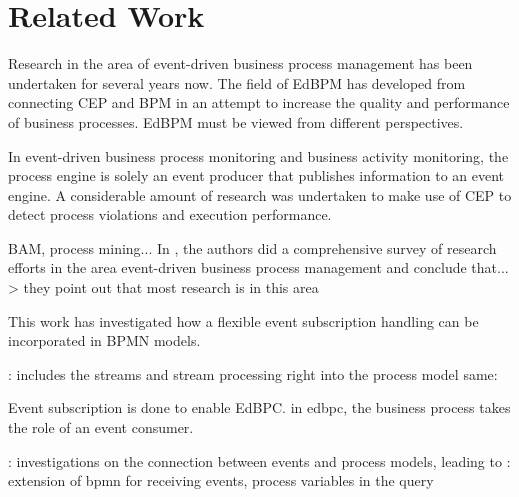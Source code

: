 \chapter{Related Work}\label{ch:relatedwork}
Research in the area of event-driven business process management has been undertaken for several years now.
The field of \acf{EdBPM} has developed from connecting \ac{CEP} and \ac{BPM} in an attempt to increase the quality and performance of business processes.
\acs{EdBPM} must be viewed from different perspectives.


In event-driven business process monitoring and business activity monitoring, the process engine is solely an event producer that publishes information to an event engine.
A considerable amount of research was undertaken to make use of CEP to detect process violations and execution performance. 

BAM, process mining... \cite{janiesch:poc-eventdriven-bam}
In \cite{Krumeich2014EventDrivenBP}, the authors did a comprehensive survey of research efforts in the area event-driven business process management and conclude that... > they point out that most research is in this area


This work has investigated how a flexible event subscription handling can be incorporated in BPMN models.

\cite{appel2014modeling}: includes the streams and stream processing right into the process model
same: \cite{biornstad2006control}

Event subscription is done to enable \ac{EdBPC}.
in edbpc, the business process takes the role of an event consumer.

\cite{Cabanillas2014}: investigations on the connection between events and process models, leading to \cite{Baumgrass2016}: extension of bpmn for receiving events, process variables in the query

